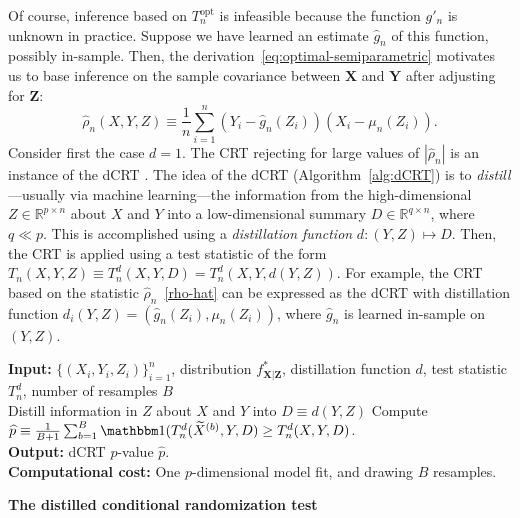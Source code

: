 \documentclass[12pt]{article}
\let\oldnl\nl%
\newcommand{\nonl}{\renewcommand{\nl}{\let\nl\oldnl}}%
\theoremstyle{definition}
\theoremstyle{remark}
\newcommand{\prx}{\bm X}
\newcommand{\srx}{X}
\newcommand{\prz}{\bm Z}
\newcommand{\srz}{Z}
\newcommand{\srxk}{\widetilde X}
\newcommand{\pry}{{\bm Y}}
\newcommand{\sry}{Y}
\begin{document}
Of course, inference based on $T_n^{\text{opt}}$ is infeasible because the function $g'_n$ is unknown in practice. Suppose we have learned an estimate $\widehat g_n$ of this function, possibly in-sample. Then, the derivation~\eqref{eq:optimal-semiparametric} motivates us to base inference on the sample covariance between $\prx$ and $\pry$ after adjusting for $\prz$:
\begin{equation}
	\widehat \rho_n(\srx, \sry, \srz) \equiv \frac1n\sum_{i = 1}^n (\sry_{i} - \widehat g_n(\srz_{i}))(\srx_{i} - \mu_n(\srz_i)).
	\label{rho-hat}
\end{equation}
Consider first the case $d = 1$. The CRT rejecting for large values of $|\widehat \rho_n|$ is an instance of the dCRT \cite{Liu2020}. The idea of the dCRT (Algorithm~\ref{alg:dCRT}) is to \textit{distill}---usually via machine learning---the information from the high-dimensional $\srz \in \mathbb R^{p \times n}$ about $\srx$ and $\sry$ into a low-dimensional summary $D \in \mathbb R^{q \times n}$,  where $q \ll p$. This is accomplished using a \textit{distillation function} $d: (\sry, \srz) \mapsto D$. Then, the CRT is applied using a test statistic of the form $T_n(\srx, \sry, \srz) \equiv T_n^d(\srx, \sry, D) = T_n^d(\srx, \sry, d(\sry, \srz))$. For example, the CRT based on the statistic $\widehat \rho_n$~\eqref{rho-hat} can be expressed as the dCRT with distillation function $d_i(\sry, \srz) = (\widehat g_n(\srz_i), \mu_n(Z_i))$, where $\widehat g_n$ is learned in-sample on $(\sry, \srz)$. 

\begin{center}
	\begin{minipage}{\linewidth}
		\begin{algorithm}[H]
			\nonl  \textbf{Input:} $\{(\srx_i, \sry_i, \srz_i)\}_{i=1}^n$, distribution  $f^*_{\prx|\prz}$, distillation function $d$, test statistic $T_n^d$, number of resamples $B$\\
			Distill information in $\srz$ about $\srx$ and $\sry$ into $D \equiv d(\sry, \srz)$\;
			\For{$b = 1, 2, \dots, B$}{
				Resample $\srxk_i^{(b)} \overset{\text{ind}}\sim f^*_{\prx|\prz = \srz_i},\ i = 1, \dots, n$\;
			}
			Compute $\widehat p \equiv \frac{1}{B+1}\sum_{b = 1}^B \mathbbm 1(T_n^d(\srxk^{(b)}, \sry, D) \geq T_n^d(\srx, \sry, D)$.\\
			\nonl \textbf{Output:} dCRT $p$-value $\widehat p$.\\
			\nonl \textbf{Computational cost:} One $p$-dimensional model fit, and drawing $B$ resamples.
			\caption{\bf The distilled conditional randomization test}
			\label{alg:dCRT}
		\end{algorithm}
	\end{minipage}
\end{center}
\end{document}
